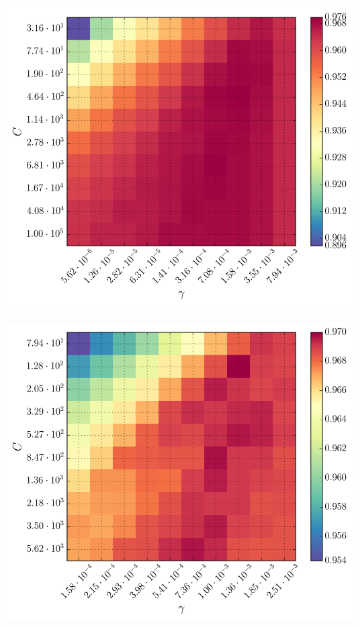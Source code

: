 \begin{figure}[ht!]
\begin{subfigure}[t]{0.49\textwidth}
	\end{subfigure}
	\begin{subfigure}[t]{0.49\textwidth}
		\centering
		\includegraphics[width=\textwidth]{figures/gridsearch/svm/superclasses/svm-superclasses-03.png}
	\end{subfigure}
	\begin{subfigure}[t]{0.49\textwidth}
		\centering
		\includegraphics[width=\textwidth]{figures/gridsearch/svm/superclasses/svm-superclasses-04.png}

\end{subfigure}
\end{figure}
